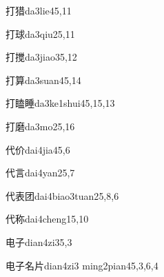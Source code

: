 \begin{verbete}{打猎}{da3lie4}{5,11}
\end{verbete}

\begin{verbete}{打球}{da3qiu2}{5,11}
\end{verbete}

\begin{verbete}{打搅}{da3jiao3}{5,12}
\end{verbete}

\begin{verbete}{打算}{da3suan4}{5,14}
\end{verbete}

\begin{verbete}{打瞌睡}{da3ke1shui4}{5,15,13}
\end{verbete}

\begin{verbete}{打磨}{da3mo2}{5,16}
\end{verbete}

\begin{verbete}{代价}{dai4jia4}{5,6}
\end{verbete}

\begin{verbete}{代言}{dai4yan2}{5,7}
\end{verbete}

\begin{verbete}{代表团}{dai4biao3tuan2}{5,8,6}
\end{verbete}

\begin{verbete}{代称}{dai4cheng1}{5,10}
\end{verbete}

\begin{verbete}{电子}{dian4zi3}{5,3}
\end{verbete}

\begin{verbete}{电子名片}{dian4zi3 ming2pian4}{5,3,6,4}
\end{verbete}

